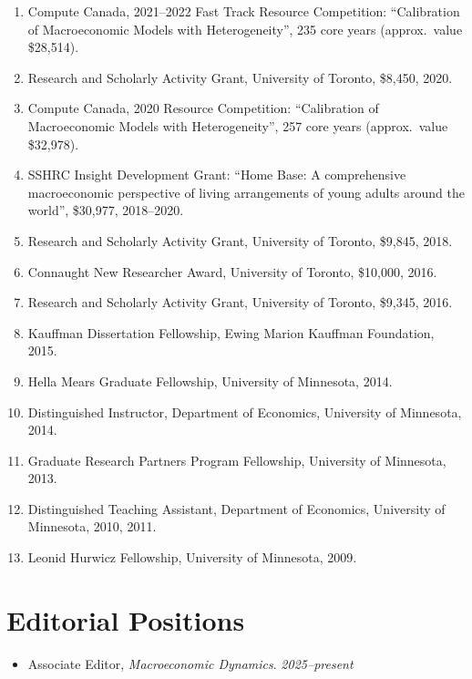 \documentclass[letterpaper]{article}
\newcommand{\dt}[1]{\hfill\textit{#1}}
\begin{document}
\begin{enumerate}
\pagebreak
\item Compute Canada, 2021--2022 Fast Track Resource Competition: ``Calibration of Macroeconomic Models with Heterogeneity'', 235 core years (approx.\ value \$28,514).
\item Research and Scholarly Activity Grant, University of Toronto, \$8,450, 2020.
\item Compute Canada, 2020 Resource Competition: ``Calibration of Macroeconomic Models with Heterogeneity'', 257 core years (approx.\ value \$32,978).
\item SSHRC Insight Development Grant: ``Home Base: A comprehensive macroeconomic perspective of living arrangements of young adults around the world'', \$30,977, 2018--2020.
\item Research and Scholarly Activity Grant, University of Toronto, \$9,845, 2018.
\item Connaught New Researcher Award, University of Toronto, \$10,000, 2016.
\item Research and Scholarly Activity Grant, University of Toronto, \$9,345, 2016.
\item Kauffman Dissertation Fellowship, Ewing Marion Kauffman Foundation, 2015.
\item Hella Mears Graduate Fellowship, University of Minnesota, 2014.
\item Distinguished Instructor, Department of Economics, University of Minnesota, 2014.
\item Graduate Research Partners Program Fellowship, University of Minnesota, 2013.
\item Distinguished Teaching Assistant, Department of Economics, University of Minnesota, 2010, 2011.
\item Leonid Hurwicz Fellowship, University of Minnesota, 2009.
\end{enumerate}

\section*{Editorial Positions}
\begin{itemize}
\item Associate Editor, \textit{Macroeconomic Dynamics}. \dt{2025--present}
\end{itemize}

\end{document}
